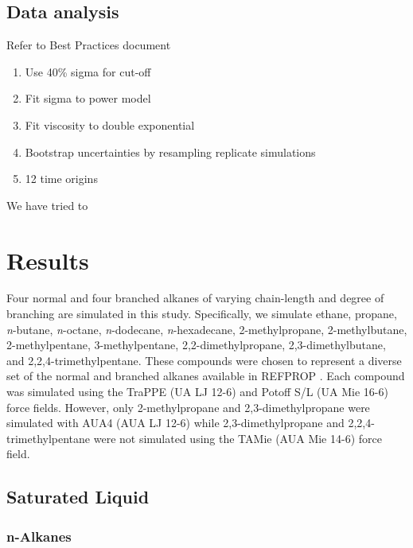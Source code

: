 \documentclass[preprint,review,12pt]{elsarticle}
\begin{document}
	\subsection{Data analysis}
	
	Refer to Best Practices document
	
	\begin{enumerate}
		\item Use 40\% sigma for cut-off
		\item Fit sigma to power model
		\item Fit viscosity to double exponential
		\item Bootstrap uncertainties by resampling replicate simulations
		\item 12 time origins
	\end{enumerate}
	
	We have tried to 
	
	\section{Results}
	
	Four normal and four branched alkanes of varying chain-length and degree of branching are simulated in this study. Specifically, we simulate ethane, propane, \textit{n}-butane, \textit{n}-octane, \textit{n}-dodecane, \textit{n}-hexadecane, 2-methylpropane, 2-methylbutane, 2-methylpentane, 3-methylpentane, 2,2-dimethylpropane, 2,3-dimethylbutane, and 2,2,4-trimethylpentane. These compounds were chosen to represent a diverse set of the normal and branched alkanes available in REFPROP \cite{LEMMON-RP91,Ethane2006,Propane2009,Butane2006,Beckmueller2017,Lemmon2006,Blackham2017}. Each compound was simulated using the TraPPE (UA LJ 12-6) and Potoff S/L (UA Mie 16-6) force fields. However, only 2-methylpropane and 2,3-dimethylpropane were simulated with AUA4 (AUA LJ 12-6) while 2,3-dimethylpropane and 2,2,4-trimethylpentane were not simulated using the TAMie (AUA Mie 14-6) force field.
	
	\subsection{Saturated Liquid} \label{sec:eta_sat}
	
	\subsubsection{n-Alkanes}
	
	
\end{document}
